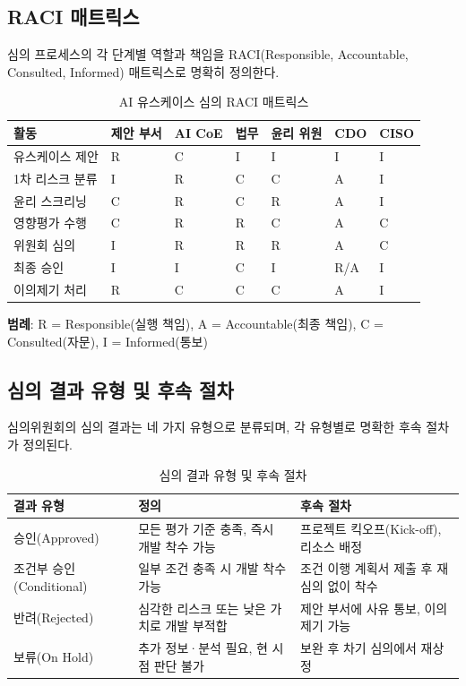 \subsection{RACI 매트릭스}
\label{sec:8.4.3}

심의 프로세스의 각 단계별 역할과 책임을 RACI(Responsible, Accountable, Consulted, Informed) 매트릭스로 명확히 정의한다.

\begin{table}[htbp]
\centering
\caption{AI 유스케이스 심의 RACI 매트릭스}
\label{tab:raci_matrix}
\begin{tabularx}{\textwidth}{Xp{1.5cm}p{1.5cm}p{1.5cm}p{1.5cm}p{1.5cm}p{1.5cm}}
\toprule
\textbf{활동} & \textbf{제안 부서} & \textbf{AI CoE} & \textbf{법무} & \textbf{윤리 위원} & \textbf{CDO} & \textbf{CISO} \\
\midrule
유스케이스 제안 & R & C & I & I & I & I \\
1차 리스크 분류 & I & R & C & C & A & I \\
윤리 스크리닝 & C & R & C & R & A & I \\
영향평가 수행 & C & R & R & C & A & C \\
위원회 심의 & I & R & R & R & A & C \\
최종 승인 & I & I & C & I & R/A & I \\
이의제기 처리 & R & C & C & C & A & I \\
\bottomrule
\end{tabularx}
\end{table}

\noindent \textbf{범례}: R = Responsible(실행 책임), A = Accountable(최종 책임), C = Consulted(자문), I = Informed(통보)

\subsection{심의 결과 유형 및 후속 절차}
\label{sec:8.4.4}

심의위원회의 심의 결과는 네 가지 유형으로 분류되며, 각 유형별로 명확한 후속 절차가 정의된다.

\begin{table}[htbp]
\centering
\caption{심의 결과 유형 및 후속 절차}
\label{tab:review_outcomes}
\begin{tabularx}{\textwidth}{p{2.5cm}Xp{4cm}}
\toprule
\textbf{결과 유형} & \textbf{정의} & \textbf{후속 절차} \\
\midrule
승인(Approved) & 모든 평가 기준 충족, 즉시 개발 착수 가능 & 프로젝트 킥오프(Kick-off), 리소스 배정 \\
\midrule
조건부 승인(Conditional) & 일부 조건 충족 시 개발 착수 가능 & 조건 이행 계획서 제출 후 재심의 없이 착수 \\
\midrule
반려(Rejected) & 심각한 리스크 또는 낮은 가치로 개발 부적합 & 제안 부서에 사유 통보, 이의제기 가능 \\
\midrule
보류(On Hold) & 추가 정보·분석 필요, 현 시점 판단 불가 & 보완 후 차기 심의에서 재상정 \\
\bottomrule
\end{tabularx}
\end{table}

